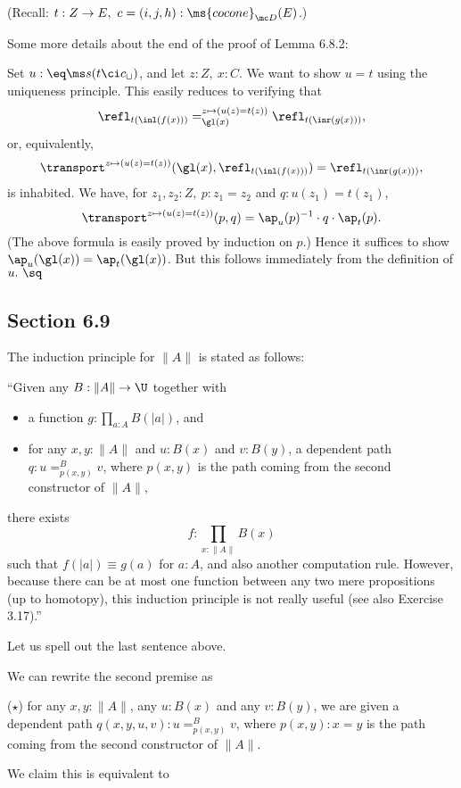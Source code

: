 \documentclass[12pt]{article}
\begin{document}
\nn(Recall: $t:Z\to E,\ c=(i,j,h):\ms{cocone}_{\mc D}(E)$.)

Some more details about the end of the proof of Lemma 6.8.2:

Set $u:\eq\ms s(t\ci c_\sqcup)$, and let $z:Z,\ x:C$. We want to show $u=t$ using the uniqueness principle. This easily reduces to verifying that 
$$
\refl_{t(\inl(f(x)))}=_{\gl(x)}^{z\mapsto(u(z)=t(z))}\refl_{t(\inr(g(x)))},
$$ 
or, equivalently, 
$$
\transport^{z\mapsto(u(z)=t(z))}(\gl(x),\refl_{t(\inl(f(x)))})=\refl_{t(\inr(g(x)))},
$$ 
is inhabited. We have, for $z_1,z_2:Z,\ p:z_1=z_2$ and $q:u(z_1)=t(z_1)$, 
$$
\transport^{z\mapsto(u(z)=t(z))}(p,q)=\ap_u(p)^{-1}\cdot q\cdot\ap_t(p).
$$ 
(The above formula is easily proved by induction on $p$.) Hence it suffices to show $\ap_u(\gl(x))=\ap_t(\gl(x))$. But this follows immediately from the definition of $u.\ \sq$


\subsection{Section 6.9}\label{69}

The induction principle for $\lVert A\rVert$ is stated as follows:

\nn``Given any $B:\lVert A\rVert\to\U$ together with
\begin{itemize}
\item a function $g:\prod_{a:A}B(\lvert a\rvert)$, and
\item for any $x,y:\lVert A\rVert$ and $u:B(x)$ and $v:B(y)$, a dependent path $q:u=^B_{p(x,y)}v$, where $p(x,y)$ is the path coming from the second constructor of $\lVert A\rVert$,
\end{itemize}
there exists 
$$
f:\prod_{x:\lVert A\rVert}B(x)
$$ 
such that $f(\lvert a\rvert)\equiv g(a)$ for $a:A$, and also another computation rule. However, because there can be at most one function between any two mere propositions (up to homotopy), this induction principle is not really useful (see also Exercise 3.17).''

Let us spell out the last sentence above.

We can rewrite the second premise as

\nn($\star$) for any $x,y:\lVert A\rVert$, any $u:B(x)$ and any $v:B(y)$, we are given a dependent path $q(x,y,u,v):u=^B_{p(x,y)}v$, where $p(x,y):x=y$ is the path coming from the second constructor of $\lVert A\rVert$.

We claim this is equivalent to
\end{document}
